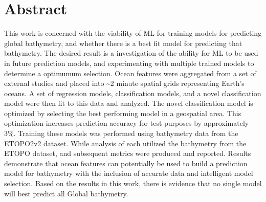 \section{Abstract}
\setlength{\parindent}{10ex}
This work is concerned with the viability of \ac{ML} for training models  for predicting global bathymetry, and whether there is a best fit model for predicting that bathymetry.
The desired result is a investigation of the ability for \ac{ML} to be used in future prediction models, and experimenting with multiple trained models to determine a optimumum selection.
Ocean features were aggregated from a set of external studies and placed into \~{}2 minute spatial grids representing Earth's oceans.
A set of regression models, classification models, and a novel classification model were then fit to this data and analyzed.
The novel classification model is optimized by selecting the best performing model in a geospatial area.
This optimization increases prediction accuracy for test purposes by approximately 3\%.
Training these models was performed using bathymetry data from the ETOPO2v2 dataset.
While analysis of each utilized the bathymetry from the ETOPO dataset, and subsequent metrics were produced and reported.
Results demonstrate that ocean features can potentially be used to build a prediction model for bathymetry with the inclusion of accurate data and intelligent model selection.
Based on the results in this work, there is evidence that no single model will best predict all Global bathymetry.
